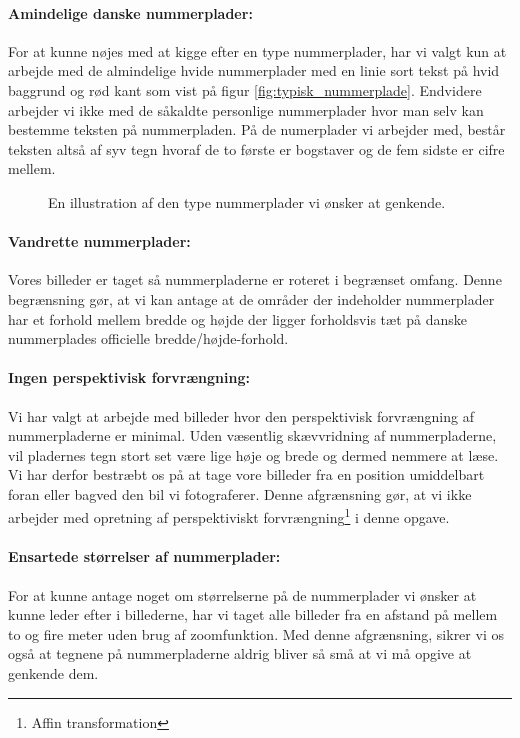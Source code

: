\paragraph{Amindelige danske nummerplader:}
For at kunne nøjes med at kigge efter en type nummerplader, har vi valgt kun at arbejde med de almindelige hvide nummerplader med en linie sort tekst på hvid baggrund og rød kant som vist på figur \vref{fig:typisk_nummerplade}. Endvidere arbejder vi ikke med de såkaldte personlige nummerplader hvor man selv kan bestemme teksten på nummerpladen. På de numerplader vi arbejder med, består teksten altså af syv tegn hvoraf de to første er bogstaver og de fem sidste er cifre mellem.

\begin{figure}[htp]
\centering
{} 
\caption{En illustration af den type nummerplader vi ønsker at genkende.}
\label{fig:typisk_nummerplade}
\end{figure}

\paragraph{Vandrette nummerplader:}
Vores billeder er taget så nummerpladerne er roteret i begrænset omfang. Denne begrænsning gør, at vi kan antage at de områder der indeholder nummerplader har et forhold mellem bredde og højde der ligger forholdsvis tæt på danske nummerplades officielle bredde/højde-forhold.

\paragraph{Ingen perspektivisk forvrængning:}
Vi har valgt at arbejde med billeder hvor den perspektivisk forvrængning af nummerpladerne er minimal. Uden væsentlig skævvridning af nummerpladerne, vil pladernes tegn stort set være lige høje og brede og dermed nemmere at læse. Vi har derfor bestræbt os på at tage vore billeder fra en position umiddelbart foran eller bagved den bil vi fotograferer. Denne afgrænsning gør, at vi ikke arbejder med opretning af perspektiviskt forvrængning\footnote{Affin transformation} i denne opgave. 

\paragraph{Ensartede størrelser af nummerplader:}
For at kunne antage noget om størrelserne på de nummerplader vi ønsker at kunne leder efter i billederne, har vi taget alle billeder fra en afstand på mellem to og fire meter uden brug af zoomfunktion. Med denne afgrænsning, sikrer vi os også at tegnene på nummerpladerne aldrig bliver så små at vi må opgive at genkende dem.

